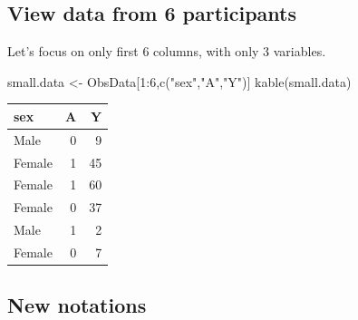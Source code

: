 \documentclass[
]{book}
\newenvironment{Shaded}{\begin{snugshade}}{\end{snugshade}}
\newcommand{\DecValTok}[1]{\textcolor[rgb]{0.00,0.00,0.81}{#1}}
\newcommand{\FunctionTok}[1]{\textcolor[rgb]{0.00,0.00,0.00}{#1}}
\newcommand{\NormalTok}[1]{#1}
\newcommand{\OtherTok}[1]{\textcolor[rgb]{0.56,0.35,0.01}{#1}}
\newcommand{\SpecialCharTok}[1]{\textcolor[rgb]{0.00,0.00,0.00}{#1}}
\newcommand{\StringTok}[1]{\textcolor[rgb]{0.31,0.60,0.02}{#1}}
\begin{document}
\hypertarget{view-data-from-6-participants}{%
\subsection{View data from 6 participants}\label{view-data-from-6-participants}}

\begin{rmdcomment}
Let's focus on only first 6 columns, with only 3 variables.
\end{rmdcomment}

\begin{Shaded}
\begin{Highlighting}[]
\NormalTok{small.data }\OtherTok{\textless{}{-}}\NormalTok{ ObsData[}\DecValTok{1}\SpecialCharTok{:}\DecValTok{6}\NormalTok{,}\FunctionTok{c}\NormalTok{(}\StringTok{"sex"}\NormalTok{,}\StringTok{"A"}\NormalTok{,}\StringTok{"Y"}\NormalTok{)]}
\FunctionTok{kable}\NormalTok{(small.data)}
\end{Highlighting}
\end{Shaded}

\begin{tabular}{l|r|r}
\hline
sex & A & Y\\
\hline
Male & 0 & 9\\
\hline
Female & 1 & 45\\
\hline
Female & 1 & 60\\
\hline
Female & 0 & 37\\
\hline
Male & 1 & 2\\
\hline
Female & 0 & 7\\
\hline
\end{tabular}

\hypertarget{new-notations}{%
\subsection{New notations}\label{new-notations}}
\end{document}
